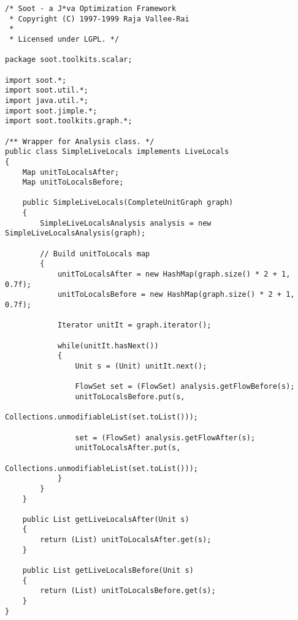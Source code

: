 \documentclass{article}
\begin{document}
\begin{verbatim}
/* Soot - a J*va Optimization Framework
 * Copyright (C) 1997-1999 Raja Vallee-Rai
 *
 * Licensed under LGPL. */

package soot.toolkits.scalar;

import soot.*;
import soot.util.*;
import java.util.*;
import soot.jimple.*;
import soot.toolkits.graph.*;

/** Wrapper for Analysis class. */
public class SimpleLiveLocals implements LiveLocals
{
    Map unitToLocalsAfter;
    Map unitToLocalsBefore;

    public SimpleLiveLocals(CompleteUnitGraph graph)
    {                        
        SimpleLiveLocalsAnalysis analysis = new SimpleLiveLocalsAnalysis(graph);

        // Build unitToLocals map
        {
            unitToLocalsAfter = new HashMap(graph.size() * 2 + 1, 0.7f);
            unitToLocalsBefore = new HashMap(graph.size() * 2 + 1, 0.7f);

            Iterator unitIt = graph.iterator();

            while(unitIt.hasNext())
            {
                Unit s = (Unit) unitIt.next();
 
                FlowSet set = (FlowSet) analysis.getFlowBefore(s);
                unitToLocalsBefore.put(s, 
                                   Collections.unmodifiableList(set.toList()));
                
                set = (FlowSet) analysis.getFlowAfter(s);
                unitToLocalsAfter.put(s, 
                                   Collections.unmodifiableList(set.toList()));
            }            
        }
    }

    public List getLiveLocalsAfter(Unit s)
    {
        return (List) unitToLocalsAfter.get(s);
    }
    
    public List getLiveLocalsBefore(Unit s)
    {
        return (List) unitToLocalsBefore.get(s);
    }
}
\end{verbatim}
\end{document}
